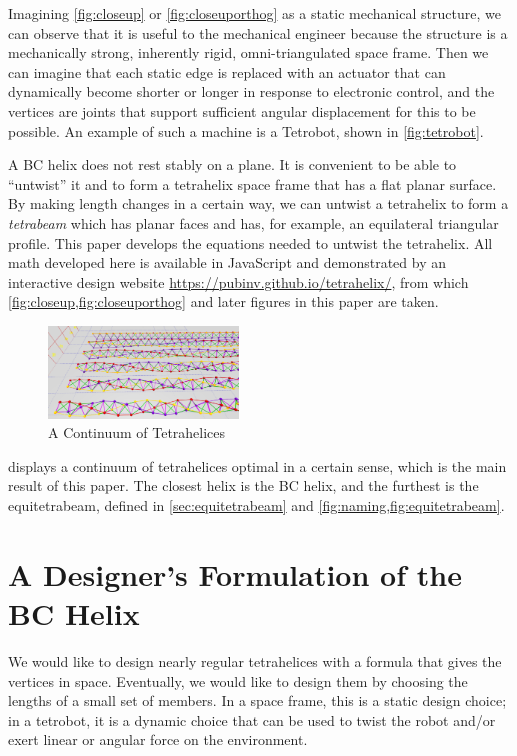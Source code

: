 \documentclass[twocolumn,10pt]{asme2ej}
\begin{document}
Imagining \cref{fig:closeup} or \cref{fig:closeuporthog} as a static mechanical structure,
we can observe that it is useful to the mechanical engineer
because the structure is a mechanically strong, inherently rigid,
omni-triangulated space frame.
Then we can imagine that each static edge is replaced with an
actuator that can dynamically become shorter or longer in response to electronic control,
and the vertices are joints that support sufficient angular displacement
for this to be possible. An example of such a machine is a Tetrobot,
shown in \cref{fig:tetrobot}.

A BC helix does not rest stably on a plane. It is convenient to
be able to ``untwist'' it and to form a tetrahelix space frame that has a
flat planar surface. By making length changes in a certain way, we can
untwist a tetrahelix to form a \emph{tetrabeam} which has planar faces
and has, for example, an equilateral triangular profile. This paper
develops the equations needed to untwist the tetrahelix. All math
developed here is available in JavaScript and demonstrated by an interactive
design website \url{https://pubinv.github.io/tetrahelix/}\cite{readtetrahelix},
from which \cref{fig:closeup,fig:closeuporthog} and later figures in this paper 
are taken.

\begin{figure}
  \centering
     \includegraphics[width=0.45\textwidth]{figures/TetrahelixSeries2.png}
     \caption{A Continuum of Tetrahelices}
  \label{fig:series}
\end{figure}


 displays a continuum of tetrahelices optimal in a certain sense,
which is the main result of this
paper. The closest helix is the BC helix, and the furthest
is the equitetrabeam, defined in \cref{sec:equitetrabeam} and \cref{fig:naming,fig:equitetrabeam}.

\section{A Designer's Formulation of the BC Helix}

We would like to design nearly regular tetrahelices with a formula that
gives the vertices in space. Eventually, we would like to design them
by choosing the lengths of a small set of members.
In a space frame, this is a static design choice; in a tetrobot, it is a
dynamic choice that can be used to twist the robot and/or exert linear or
angular force on the environment.
\end{document}
